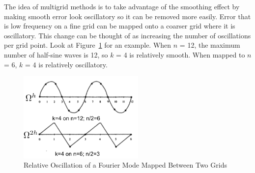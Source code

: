 The idea of multigrid methods is to take advantage of the smoothing effect by making smooth error look oscillatory so it can be removed more easily. Error that is low frequency on a fine grid can be mapped onto a coarser grid where it is oscillatory. This change can be thought of as increasing the number of oscillations per grid point. Look at Figure~\ref{fig:FourierGridError} for an example. When $n$ = 12, the maximum number of half-sine waves is 12, so $k$ = 4 is relatively smooth. When mapped to $n$ = 6, $k$ = 4 is relatively oscillatory. 
%
\begin{figure}[!ht]
    \begin{center}
      \includegraphics [width=0.55\textwidth, height=0.33\textheight] {FourierGridError}
   \end{center}
   \caption{Relative Oscillation of a Fourier Mode Mapped Between Two Grids \cite{Briggs2000}}
   \label{fig:FourierGridError}
\end{figure}

